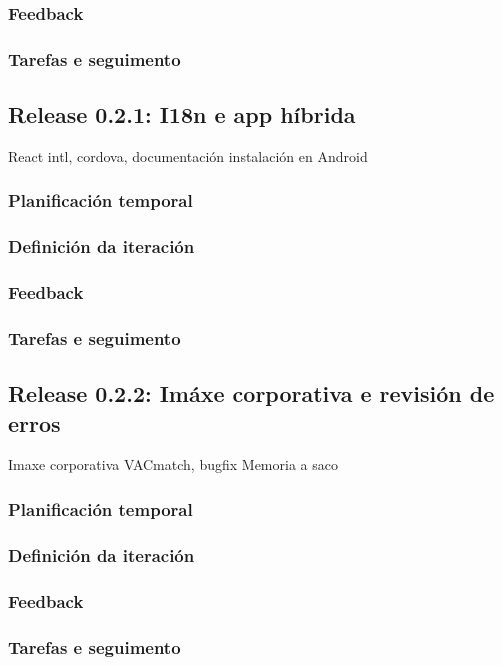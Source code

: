       \subsubsection{Feedback}
      \subsubsection{Tarefas e seguimento}

    \subsection{Release 0.2.1: I18n e app híbrida}
    React intl, cordova, documentación instalación en Android
      \subsubsection{Planificación temporal}
      \subsubsection{Definición da iteración}
      \subsubsection{Feedback}
      \subsubsection{Tarefas e seguimento}

    \subsection{Release 0.2.2: Imáxe corporativa e revisión de erros}
    Imaxe corporativa VACmatch, bugfix
    Memoria a saco
      \subsubsection{Planificación temporal}
      \subsubsection{Definición da iteración}
      \subsubsection{Feedback}
      \subsubsection{Tarefas e seguimento}


